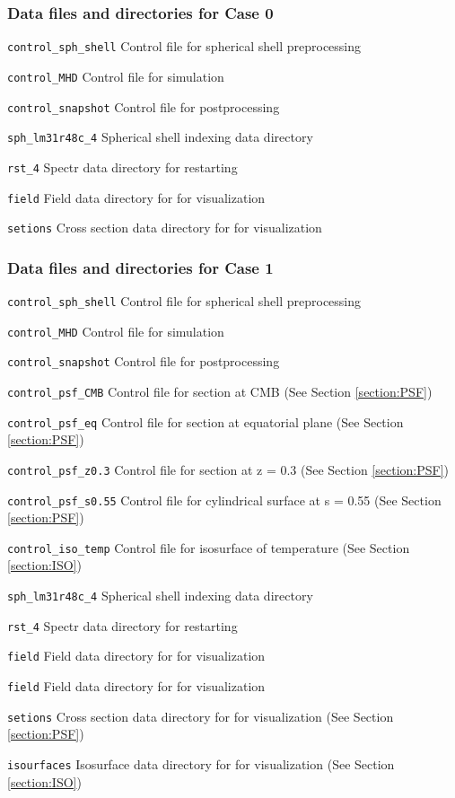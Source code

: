 \subsubsection{Data files and directories for Case 0}
\label{section:bench_case0}
%
\begin{description}
\item{\tt control\_sph\_shell}	Control file for spherical shell preprocessing
\item{\tt  control\_MHD}		Control file for simulation
\item{\tt control\_snapshot}	Control file for postprocessing
\item{\tt sph\_lm31r48c\_4} 	Spherical shell indexing data directory
\item{\tt rst\_4}				Spectr data directory for restarting
\item{\tt field}				Field data directory for for visualization
\item{\tt setions}			Cross section data directory for for visualization
\end{description}
%
\subsubsection{Data files and directories for Case 1}
\label{section:bench_case1}
%
\begin{description}
\item{\tt control\_sph\_shell}	Control file for spherical shell preprocessing
\item{\tt  control\_MHD}		Control file for simulation
\item{\tt control\_snapshot}	Control file for postprocessing
\item{\tt control\_psf\_CMB}	Control file for section at CMB (See Section \ref{section:PSF})
\item{\tt control\_psf\_eq}		Control file for section at equatorial plane (See Section \ref{section:PSF})
\item{\tt control\_psf\_z0.3}	Control file for section at z = 0.3 (See Section \ref{section:PSF})
\item{\tt control\_psf\_s0.55}	Control file for cylindrical surface at s = 0.55 (See Section \ref{section:PSF})
\item{\tt control\_iso\_temp}	Control file for isosurface of temperature (See Section \ref{section:ISO})
\item{\tt sph\_lm31r48c\_4} 	Spherical shell indexing data directory
\item{\tt rst\_4}				Spectr data directory for restarting
\item{\tt field}				Field data directory for for visualization
\item{\tt field}				Field data directory for for visualization
\item{\tt setions}			Cross section data directory for for visualization (See Section \ref{section:PSF})
\item{\tt isourfaces}			Isosurface data directory for for visualization (See Section \ref{section:ISO})
\end{description}

